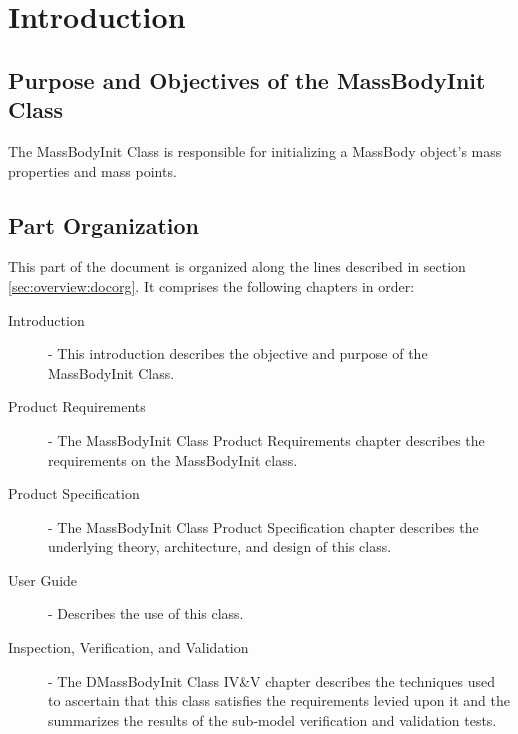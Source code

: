 %
\chapter{Introduction}\label{ch:MassBodyInit:intro}

\section{Purpose and Objectives of the
MassBodyInit Class}

The MassBodyInit Class
is responsible for initializing a MassBody object's
mass properties and mass points.

\section{Part Organization}
This part of the \ModelDesc document is organized along the
lines described in section \ref{sec:overview:docorg}. It
comprises the following chapters in order:

\begin{description}
\item[Introduction] -
This introduction describes the objective and purpose of the
MassBodyInit Class.

\item[Product Requirements] -
The MassBodyInit Class Product Requirements chapter
describes the requirements on the MassBodyInit class.

\item[Product Specification] -
The MassBodyInit Class Product Specification chapter
describes the underlying theory, architecture, and design of
this class.

\item[User Guide] -
Describes the use of this class.

\item[Inspection, Verification, and Validation] -
The DMassBodyInit Class IV\&V chapter
describes the techniques used to ascertain that
this class satisfies the requirements levied upon it
and the summarizes the results of
the sub-model verification and validation tests.
\end{description}
